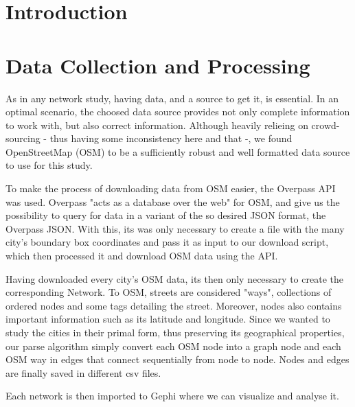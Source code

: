 \documentclass{article}
\begin{document}
\begin{multicols}{2}


\section{Introduction}


\section{Data Collection and Processing}
\label{section.data}

As in any network study, having data, and a source to get it, is essential. In an optimal scenario, the choosed data source provides not only complete information to work with, but also correct information. Although heavily relieing on crowd-sourcing - thus having some inconsistency here and that -, we found OpenStreetMap (OSM) to be a sufficiently robust and well formatted data source to use for this study. 

To make the process of downloading data from OSM easier, the Overpass API was used. Overpass "acts as a database over the web" for OSM, and give us the possibility to query for data in a variant of the so desired JSON format, the Overpass JSON. With this, its was only necessary to create a file with the many city's boundary box coordinates and pass it as input to our download script, which then processed it and download OSM data using the API.

Having downloaded every city's OSM data, its then only necessary to create the corresponding Network. To OSM, streets are considered "ways", collections of ordered nodes and some tags detailing the street.  Moreover, nodes also contains important information such as its latitude and longitude. Since we wanted to study the cities in their primal form, thus preserving its geographical properties, our parse algorithm simply convert each OSM node into a graph node and each OSM way in edges that connect sequentially from node to node. Nodes and edges are finally saved in different csv files.

Each network is then imported to Gephi where we can visualize and analyse it.




\end{multicols}
\end{document}
